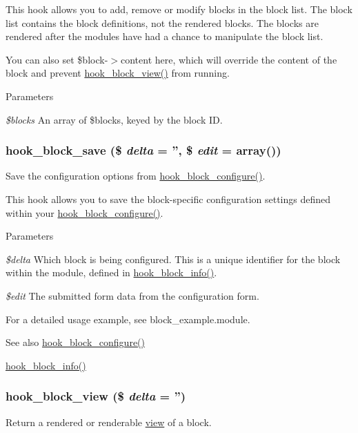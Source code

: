 This hook allows you to add, remove or modify blocks in the block list. The block list contains the block definitions, not the rendered blocks. The blocks are rendered after the modules have had a chance to manipulate the block list.

You can also set \$block-\/$>$content here, which will override the content of the block and prevent \hyperlink{group__hooks_gaa14092a3e74cdc57aa295100cfd6860d}{hook\_\-block\_\-view()} from running.


\begin{DoxyParams}{Parameters}
\item[{\em \$blocks}]An array of \$blocks, keyed by the block ID. \end{DoxyParams}
\hypertarget{group__hooks_ga622024ce4f818c241ca7a765e829f928}{
\subsubsection[{hook\_\-block\_\-save}]{\setlength{\rightskip}{0pt plus 5cm}hook\_\-block\_\-save (\$ {\em delta} = {\ttfamily ''}, \/  \$ {\em edit} = {\ttfamily array()})}}
\label{group__hooks_ga622024ce4f818c241ca7a765e829f928}
Save the configuration options from \hyperlink{group__hooks_gacc86fefd1e0299f387f79a37dd1a48b7}{hook\_\-block\_\-configure()}.

This hook allows you to save the block-\/specific configuration settings defined within your \hyperlink{group__hooks_gacc86fefd1e0299f387f79a37dd1a48b7}{hook\_\-block\_\-configure()}.


\begin{DoxyParams}{Parameters}
\item[{\em \$delta}]Which block is being configured. This is a unique identifier for the block within the module, defined in \hyperlink{group__hooks_ga2bd926c3e90deeba0c3ba64fb3c64d73}{hook\_\-block\_\-info()}. \item[{\em \$edit}]The submitted form data from the configuration form.\end{DoxyParams}
For a detailed usage example, see block\_\-example.module.

\begin{DoxySeeAlso}{See also}
\hyperlink{group__hooks_gacc86fefd1e0299f387f79a37dd1a48b7}{hook\_\-block\_\-configure()} 

\hyperlink{group__hooks_ga2bd926c3e90deeba0c3ba64fb3c64d73}{hook\_\-block\_\-info()} 
\end{DoxySeeAlso}
\hypertarget{group__hooks_gaa14092a3e74cdc57aa295100cfd6860d}{
\subsubsection[{hook\_\-block\_\-view}]{\setlength{\rightskip}{0pt plus 5cm}hook\_\-block\_\-view (\$ {\em delta} = {\ttfamily ''})}}
\label{group__hooks_gaa14092a3e74cdc57aa295100cfd6860d}
Return a rendered or renderable \hyperlink{classview}{view} of a block.


